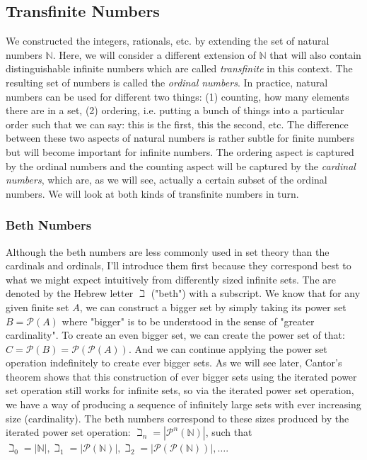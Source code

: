 \subsection{Transfinite Numbers}
We constructed the integers, rationals, etc. by extending the set of natural numbers $\mathbb{N}$. Here, we will consider a different extension of $\mathbb{N}$ that will also contain distinguishable infinite numbers which are called \emph{transfinite} in this context. The resulting set of numbers is called the \emph{ordinal numbers}. In practice, natural numbers can be used for different two things: (1) counting, how many elements there are in a set, (2) ordering, i.e. putting a bunch of things into a particular order such that we can say: this is the first, this the second, etc. The difference between these two aspects of natural numbers is rather subtle for finite numbers but will become important for infinite numbers. The ordering aspect is captured by the ordinal numbers and the counting aspect will be captured by the \emph{cardinal numbers}, which are, as we will see, actually a certain subset of the ordinal numbers. We will look at both kinds of transfinite numbers in turn.



\subsubsection{Beth Numbers}
Although the beth numbers are less commonly used in set theory than the cardinals and ordinals, I'll introduce them first because they correspond best to what we might expect intuitively from differently sized infinite sets. The are denoted by the Hebrew letter $\beth$ ("beth") with a subscript. We know that for any given finite set $A$, we can construct a bigger set by simply taking its power set $B = \mathcal{P}(A)$ where "bigger" is to be understood in the sense of "greater cardinality". To create an even bigger set, we can create the power set of that: $C = \mathcal{P}(B) = \mathcal{P}(\mathcal{P}(A))$. And we can continue applying the power set operation indefinitely to create ever bigger sets. As we will see later, Cantor's theorem shows that this construction of ever bigger sets using the iterated power set operation still works for infinite sets, so via the iterated power set operation, we have a way of producing a sequence of infinitely large sets with ever increasing size (cardinality). The beth numbers correspond to these sizes produced by the iterated power set operation: $\beth_n = |\mathcal{P}^n (\mathbb{N})|$, such that $\beth_0 = |\mathbb{N}|, \beth_1 = |\mathcal{P} (\mathbb{N})|, \beth_2 = |\mathcal{P}(\mathcal{P} (\mathbb{N}))|, \ldots$.


